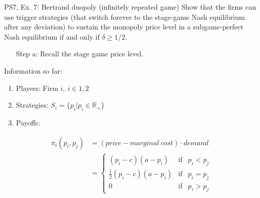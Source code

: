 \begin{frame}{PS7, Ex. 7: Bertrand duopoly (infinitely repeated game)}
    Show that the firms can use trigger strategies (that switch forever to the stage-game Nash equilibrium after any deviation) to sustain the monopoly price level in a subgame-perfect Nash equilibrium if and only if $\delta\geq1/2$.
    \vspace{-6pt}
    \begin{multicols}{2}
      \begin{itemize}
        \item[Step a:] Recall the stage game price level.
      \end{itemize}
      \vspace{-4pt}
      \vfill\null\columnbreak
      Information so far:
      \vspace{-4pt}
      \begin{enumerate}
        \item Players: Firm $i,\ i\in1,2$
        \item Strategies: $S_i=\{p_i|p_i\in\mathbb{R}_+\}$
        \item Payoffs:
      \end{enumerate}
      \vspace{-12pt}
      \begin{align*}
        \pi_i(p_i,p_j)&=(price-marginal\ cost)\cdot demand\\
                      &=\left\{\begin{array}{lcl}
          (p_i-c)(a-p_i)            & \text{if} & p_i<p_j\\
          \frac{1}{2}(p_i-c)(a-p_i) & \text{if} & p_i=p_j\\
          0                         & \text{if} & p_i>p_j
        \end{array}\right.
      \end{align*}
      \vfill\null
    \end{multicols}
\end{frame}

